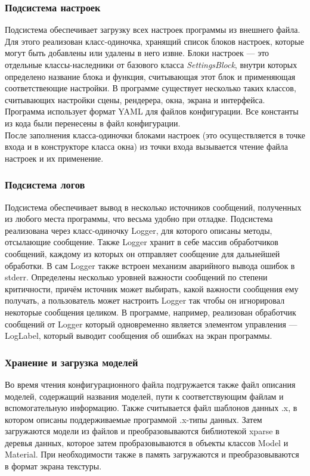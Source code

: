 \documentclass[a4paper,12pt]{report}
\numberwithin{equation}{section}
\begin{document}
\subsubsection{Подсистема настроек}
Подсистема обеспечивает загрузку всех настроек программы из внешнего файла. Для этого реализован класс-одиночка, хранящий список блоков настроек, которые могут быть добавлены или удалены в него извне. Блоки настроек --- это отдельные классы-наследники от базового класса \textit{SettingsBlock}, внутри которых определено название блока и функция, считывающая этот блок и применяющая соответствеющие настройки. В программе существует несколько таких классов, считывающих настройки сцены, рендерера, окна, экрана и интерфейса. Программа использует формат YAML для файлов конфигурации. Все константы из кода были перенесены в файл конфигурации. \\
После заполнения класса-одиночки блоками настроек (это осуществляется в точке входа и в конструкторе класса окна) из точки входа вызывается чтение файла настроек и их применение.

\subsubsection{Подсистема логов}
Подсистема обеспечивает вывод в несколько источников сообщений, полученных из любого места программы, что весьма удобно при отладке. Подсистема реализована через класс-одиночку Logger, для которого описаны методы, отсылающие сообщение. Также Logger хранит в себе массив обработчиков сообщений, каждому из которых он отправляет сообщение для дальнейшей обработки. В сам Logger также встроен механизм аварийного вывода ошибок в stderr. Определены несколько уровней важности сообщений по степени критичности, причём источник может выбирать, какой важности сообщения ему получать, а пользователь может настроить Logger так чтобы он игнорировал некоторые сообщения целиком. В программе, например, реализован обработчик сообщений от Logger который одновременно является элементом управления --- LogLabel, который выводит сообщения об ошибках на экран программы.

\subsubsection{Хранение и загрузка моделей}
Во время чтения конфигурационного файла подгружается также файл описания моделей, содержащий названия моделей, пути к соответствующим файлам и вспомогательную информацию. Также считывается файл шаблонов данных .x, в котором описаны поддерживаемые программой .x-типы данных. Затем загружаются модели из файлов и преобразовываются библиотекой xparse в деревья данных, которое затем пробразовываются в объекты классов Model и Material. При необходимости также в память загружаются и преобразовываются в формат экрана текстуры.
\end{document}
